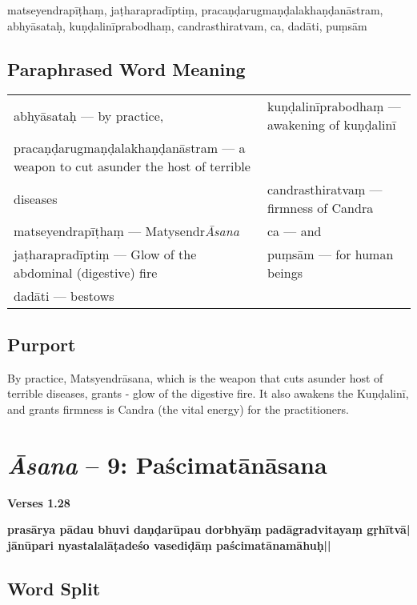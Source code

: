 matseyendrapīṭhaṃ,  jaṭharapradīptiṃ,  pracaṇḍarugmaṇḍalakhaṇḍanāstram, 
abhyāsataḥ, kuṇḍalinīprabodhaṃ,  candrasthiratvam, ca, dadāti, puṃsām

\subsection*{Paraphrased Word Meaning}

\begin{longtable}{>{\noindent\raggedright}p{5cm}>{\noindent\raggedright}p{5cm}}
abhyāsataḥ --- by practice, & kuṇḍalinīprabodhaṃ --- awakening of kuṇḍalinī\tabularnewline
pracaṇḍarugmaṇḍala\-khaṇḍa\-nāstram --- a 
weapon to cut asunder the host  of terrible\tabularnewline 
diseases & candrasthiratvaṃ --- firmness  of Candra\tabularnewline
matseyendrapīṭhaṃ --- Matysendr\textit{Āsana} & ca --- and\tabularnewline
jaṭharapradīptiṃ --- Glow of the  abdominal (digestive) fire & puṃsām --- for human beings\tabularnewline
dadāti --- bestows & 
\end{longtable}
 
\subsection*{Purport}

By practice, Matsyendrāsana, which is the weapon that cuts asunder host of terrible diseases, grants - glow of the digestive fire. It also awakens the  Kuṇḍalinī, and grants firmness is Candra (the vital energy) for the practitioners.
\newpage

\section*{\textit{Āsana} -- 9: Paścimatānāsana}

\noindent 
\textbf{Verses 1.28}

\begin{shloka}
\textbf{prasārya pādau bhuvi daṇḍarūpau dorbhyāṃ padāgradvitayaṃ gṛhītvā|}\\
\textbf{jānūpari nyastalalāṭadeśo vasediḍāṃ paścimatānamāhuḥ||}
\end{shloka}
\vspace{-10pt}

\subsection*{Word Split}
\vspace{-10pt}

